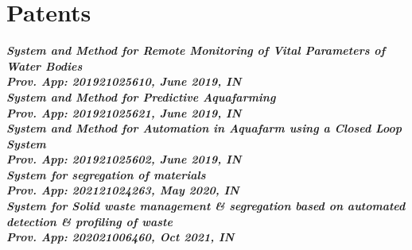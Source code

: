 \documentclass[]{deedy-resume-openfont}
\begin{document}
\begin{minipage}[t]{0.32\textwidth}
\sectionsep
\section{Patents}
\small{
{\textit{\textbf{System and Method for Remote Monitoring of Vital Parameters of Water Bodies\\Prov. App: 201921025610, June 2019, IN}}}\\
\vspace{1.5mm}
{\textit{\textbf{System and Method for Predictive Aquafarming\\Prov. App: 201921025621, June 2019, IN}}}\\
\vspace{1.5mm}
{\textit{\textbf{System and Method for Automation in Aquafarm using a Closed Loop System \\Prov. App: 201921025602, June 2019, IN}}}\\
%
\vspace{1.5mm}
{\textit{\textbf{System for segregation of materials \\Prov. App: 202121024263, May 2020, IN}}}\\
%
\vspace{1.5mm}
{\textit{\textbf{System for Solid waste management \& segregation based on
automated detection \& profiling of waste \\Prov. App: 202021006460, Oct 2021, IN}}}\\
}



\end{minipage}
\end{document}
